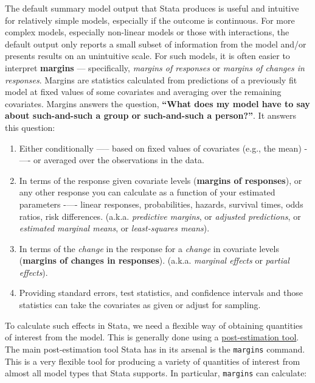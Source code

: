 \documentclass[
]{book}
\providecommand{\tightlist}{%
  \setlength{\itemsep}{0pt}\setlength{\parskip}{0pt}}
\begin{document}
The default summary model output that Stata produces is useful and intuitive for relatively simple models, especially if the outcome is continuous. For more complex models, especially non-linear models or those with interactions, the default output only reports a small subset of information from the model and/or presents results on an unintuitive scale. For such models, it is often easier to interpret \textbf{margins} --- specifically, \emph{margins of responses} or \emph{margins of changes in responses}. Margins are statistics calculated from predictions of a previously fit model at fixed values of some covariates and averaging over the remaining covariates. Margins answers the question, \textbf{``What does my model have to say about such-and-such a group or such-and-such a person?''}. It answers this question:

\begin{enumerate}
\def\labelenumi{\arabic{enumi}.}
\tightlist
\item
  Either conditionally ----- based on fixed values of covariates (e.g., the mean) -\/---- or averaged over the observations in the data.
\item
  In terms of the response given covariate levels (\textbf{margins of responses}), or any other response you can calculate as a function of your estimated parameters -\/---- linear responses, probabilities, hazards, survival times, odds ratios, risk differences. (a.k.a. \emph{predictive margins}, or \emph{adjusted predictions}, or \emph{estimated marginal means}, or \emph{least-squares means}).
\item
  In terms of the \emph{change} in the response for a \emph{change} in covariate levels (\textbf{margins of changes in responses}). (a.k.a. \emph{marginal effects} or \emph{partial effects}).
\item
  Providing standard errors, test statistics, and confidence intervals and those statistics can take the covariates as given or adjust for sampling.
\end{enumerate}

To calculate such effects in Stata, we need a flexible way of obtaining quantities of interest from the model. This is generally done using a \href{https://www.stata.com/manuals13/u20.pdf}{post-estimation tool}. The main post-estimation tool Stata has in its arsenal is the \texttt{margins} command. This is a very flexible tool for producing a variety of quantities of interest from almost all model types that Stata supports. In particular, \texttt{margins} can calculate:
\end{document}
